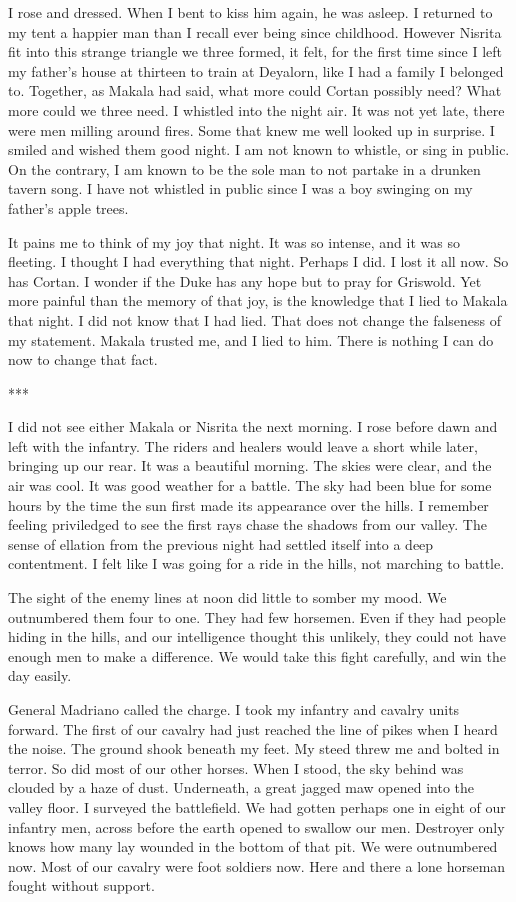 \documentclass{article}
\begin{document}
I rose and dressed. When I bent to kiss him again, he was asleep. I returned to my tent a happier man than I recall ever being since childhood. However Nisrita fit into this strange triangle we three formed, it felt, for the first time since I left my father's house at thirteen to train at Deyalorn, like I had a family I belonged to. Together, as Makala had said, what more could Cortan possibly need? What more could we three need. I whistled into the night air. It was not yet late, there were men milling around fires. Some that knew me well looked up in surprise. I smiled and wished them good night. I am not known to whistle, or sing in public. On the contrary, I am known to be the sole man to not partake in a drunken tavern song. I have not whistled in public since I was a boy swinging on my father's apple trees.

It pains me to think of my joy that night. It was so intense, and it was so fleeting. I thought I had everything that night. Perhaps I did. I lost it all now. So has Cortan. I wonder if the Duke has any hope but to pray for Griswold. Yet more painful than the memory of that joy, is the knowledge that I lied to Makala that night. I did not know that I had lied. That does not change the falseness of my statement. Makala trusted me, and I lied to him. There is nothing I can do now to change that fact. 

***

I did not see either Makala or Nisrita the next morning. I rose before dawn and left with the infantry. The riders and healers would leave a short while later, bringing up our rear. It was a beautiful morning. The skies were clear, and the air was cool. It was good weather for a battle. The sky had been blue for some hours by the time the sun first made its appearance over the hills. I remember feeling priviledged to see the first rays chase the shadows from our valley. The sense of ellation from the previous night had settled itself into a deep contentment. I felt like I was going for a ride in the hills, not marching to battle.

The sight of the enemy lines at noon did little to somber my mood. We outnumbered them four to one. They had few horsemen. Even if they had people hiding in the hills, and our intelligence thought this unlikely, they could not have enough men to make a difference. We would take this fight carefully, and win the day easily.

General Madriano called the charge. I took my infantry and cavalry units forward. The first of our cavalry had just reached the line of pikes when I heard the noise. The ground shook beneath my feet. My steed threw me and bolted in terror. So did most of our other horses. When I stood, the sky behind was clouded by a haze of dust. Underneath, a great jagged maw opened into the valley floor. I surveyed the battlefield. We had gotten perhaps one in eight of our infantry men, across before the earth opened to swallow our men. Destroyer only knows how many lay wounded in the bottom of that pit. We were outnumbered now. Most of our cavalry were foot soldiers now. Here and there a lone horseman fought without support.
\end{document}

